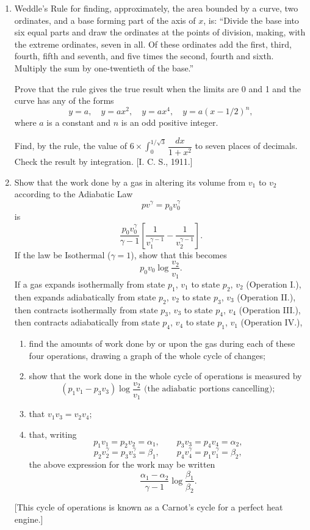 \documentclass[11pt, a4paper]{article}
\newcommand{\source}[1]{\hfill\textnormal{[#1]}}
\begin{document}
\begin{enumerate}[leftmargin=2em]
\item Weddle's Rule for finding, approximately, the area bounded by a curve, two ordinates, and a base forming part of the axis of $x$, is: ``Divide the base into six equal parts and draw the ordinates at the points of division, making, with the extreme ordinates, seven in all. Of these ordinates add the first, third, fourth, fifth and seventh, and five times the second, fourth and sixth. Multiply the sum by one-twentieth of the base.''

Prove that the rule gives the true result when the limits are 0 and 1 and the curve has any of the forms
\[
y=a, \quad y=ax^2, \quad y=ax^4, \quad y=a(x-1/2)^n,
\]
where $a$ is a constant and $n$ is an odd positive integer.

Find, by the rule, the value of $6\times\displaystyle\int_0^{1/\sqrt3}\dfrac{dx}{1+x^2}$ to seven places of decimals. Check the result by integration. \source{I. C. S., 1911.}

\item Show that the work done by a gas in altering its volume from $v_1$ to $v_2$ according to the Adiabatic Law
\[
pv^\gamma = p_0v_0^\gamma
\]
is
\[
\dfrac{p_0v_0^\gamma}{\gamma-1}\left[\dfrac{1}{v_1^{\gamma-1}}-\dfrac{1}{v_2^{\gamma-1}}\right].
\]
If the law be Isothermal ($\gamma=1$), show that this becomes
\[
p_0v_0\log\dfrac{v_2}{v_1}.
\]
If a gas expands isothermally from state $p_1$, $v_1$ to state $p_2$, $v_2$ (Operation I.), then expands adiabatically from state $p_2$, $v_2$ to state $p_3$, $v_3$ (Operation II.), then contracts isothermally from state $p_3$, $v_3$ to state $p_4$, $v_4$ (Operation III.), then contracts adiabatically from state $p_4$, $v_4$ to state $p_1$, $v_1$ (Operation IV.),
\begin{enumerate}[label=(\arabic*)]
\item find the amounts of work done by or upon the gas during each of these four operations, drawing a graph of the whole cycle of changes;
\item show that the work done in the whole cycle of operations is measured by
\[
(p_1v_1-p_3v_3)\log\dfrac{v_2}{v_1} \text{ (the adiabatic portions cancelling)};
\]
\item that $v_1v_3 = v_2v_4$;
\item that, writing
\[
p_1v_1=p_2v_2=\alpha_1, \qquad p_3v_3=p_4v_4=\alpha_2,
\]
\[
p_2v_2^\gamma=p_3v_3^\gamma=\beta_1, \qquad p_4v_4^\gamma=p_1v_1^\gamma=\beta_2,
\]
the above expression for the work may be written
\[
\dfrac{\alpha_1-\alpha_2}{\gamma-1}\log\dfrac{\beta_1}{\beta_2}.
\]
\end{enumerate}
[This cycle of operations is known as a Carnot's cycle for a perfect heat engine.]


\end{enumerate}
\end{document}

